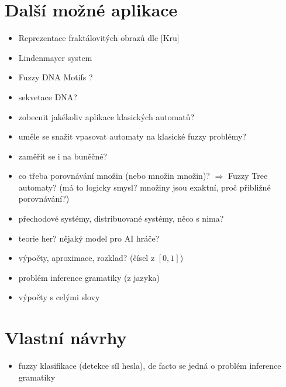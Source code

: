 \documentclass[a4paper,10pt]{article}
\begin{document}
\section{Další možné aplikace}
\begin{itemize}
 \item Reprezentace fraktálovitých obrazů dle [Kru]
 \item Lindenmayer system
 \item Fuzzy DNA Motifs ?
 \item sekvetace DNA?
 \item zobecnit jakékoliv aplikace klasických automatů?
 \item uměle se snažit vpasovat automaty na klasické fuzzy problémy?
 \item zaměřit se i na buněčné?
 \item co třeba porovnávání množin (nebo množin množin)? $\Rightarrow$ Fuzzy Tree automaty? (má to logicky smysl? množiny jsou exaktní, proč přibližné porovnávání?)
 \item přechodové systémy, distribuované systémy, něco s nima?
 \item teorie her? nějaký model pro AI hráče?
 \item výpočty, aproximace, rozklad? (čísel z $[0,1]$)
 \item problém inference gramatiky (z jazyka)
 \item výpočty s celými slovy
\end{itemize}

\section{Vlastní návrhy}
\begin{itemize}
 \item fuzzy  klasifikace (detekce síl hesla), de facto se jedná o problém inference gramatiky
 
\end{itemize}
\end{document}
